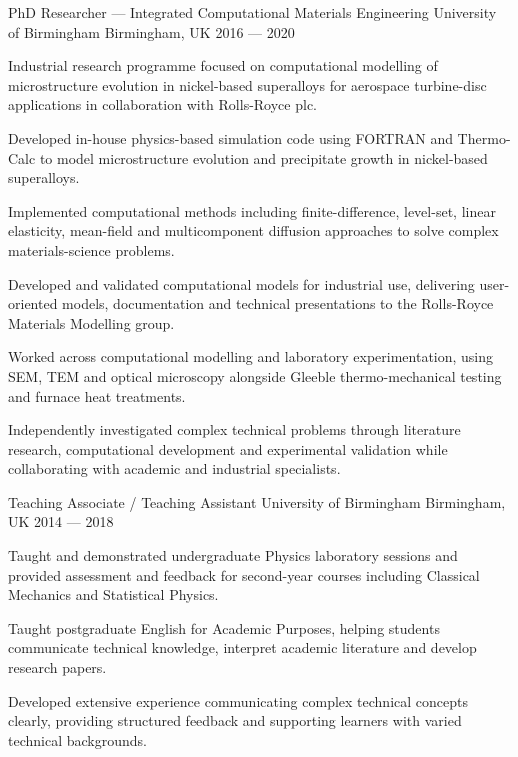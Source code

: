 \begin{cventries}
  \cventry
  {PhD Researcher --- Integrated Computational Materials Engineering} %
  {University of Birmingham } %
  {Birmingham, UK} %
  {2016 --- 2020} %
  {
    \begin{cvitems}
    \item {Industrial research programme focused on computational modelling of microstructure evolution in nickel-based superalloys for aerospace turbine-disc applications in collaboration with Rolls-Royce plc.}
    \item {Developed in-house physics-based simulation code using FORTRAN and Thermo-Calc to model microstructure evolution and precipitate growth in nickel-based superalloys.}
    \item {Implemented computational methods including finite-difference, level-set, linear elasticity, mean-field and multicomponent diffusion approaches to solve complex materials-science problems.}
    \item {Developed and validated computational models for industrial use, delivering user-oriented models, documentation and technical presentations to the Rolls-Royce Materials Modelling group.}
    \item {Worked across computational modelling and laboratory experimentation, using SEM, TEM and optical microscopy alongside Gleeble thermo-mechanical testing and furnace heat treatments.}
    \item {Independently investigated complex technical problems through literature research, computational development and experimental validation while collaborating with academic and industrial specialists.}
    \end{cvitems}
  }

  \cventry
  {Teaching Associate / Teaching Assistant} %
  {University of Birmingham } %
  {Birmingham, UK} %
  {2014 --- 2018} %
  {
    \begin{cvitems}
    \item {Taught and demonstrated undergraduate Physics laboratory sessions and provided assessment and feedback for second-year courses including Classical Mechanics and Statistical Physics.}
    \item {Taught postgraduate English for Academic Purposes, helping students communicate technical knowledge, interpret academic literature and develop research papers.}
    \item {Developed extensive experience communicating complex technical concepts clearly, providing structured feedback and supporting learners with varied technical backgrounds.}
    \end{cvitems}
  }

\end{cventries}
